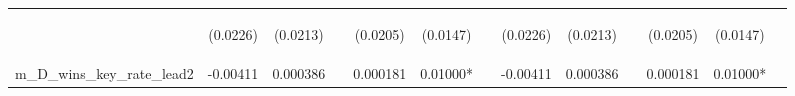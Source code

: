 \documentclass[]{article}
\begin{document}
\begin{center}
\begin{tabular}{lcccccccccccc}
\vspace{4pt} & \begin{footnotesize}(0.0226)\end{footnotesize} & \begin{footnotesize}(0.0213)\end{footnotesize} & \begin{footnotesize}\end{footnotesize} & \begin{footnotesize}(0.0205)\end{footnotesize} & \begin{footnotesize}(0.0147)\end{footnotesize} & \begin{footnotesize}\end{footnotesize} & \begin{footnotesize}(0.0226)\end{footnotesize} & \begin{footnotesize}(0.0213)\end{footnotesize} & \begin{footnotesize}\end{footnotesize} & \begin{footnotesize}(0.0205)\end{footnotesize} & \begin{footnotesize}(0.0147)\end{footnotesize} & \begin{footnotesize}\end{footnotesize} \\
m\_D\_wins\_key\_rate\_lead2 & -0.00411 & 0.000386 &  & 0.000181 & 0.01000* &  & -0.00411 & 0.000386 &  & 0.000181 & 0.01000* &  \\

\end{tabular}
\end{center}
\end{document}
